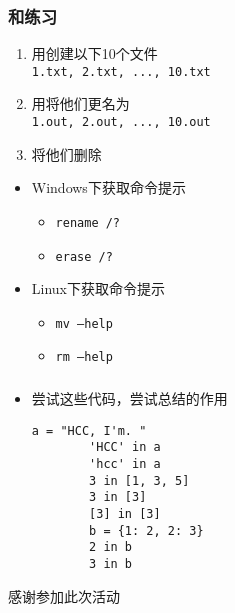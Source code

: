 \begin{frame} [fragile]
	\frametitle{和练习}
	\begin{enumerate}
	\item 用创建以下10个文件 \\
		\texttt{1.txt, 2.txt, ..., 10.txt}
	\item 用将他们更名为 \\
		\texttt{1.out, 2.out, ..., 10.out}
	\item 将他们删除
	\end{enumerate}
	\begin{itemize}
	\item Windows下获取命令提示
		\begin{itemize}
		\item \texttt{rename /?}
		\item \texttt{erase /?}
		\end{itemize}
	\item Linux下获取命令提示
		\begin{itemize}
		\item \texttt{mv --help}
		\item \texttt{rm --help}
		\end{itemize}
	\end{itemize}
\end{frame}

\begin{frame} [fragile]
	\frametitle{}
	\linespread{1.25}
	\begin{itemize}
	\item 尝试这些代码，尝试总结的作用
		\begin{lstlisting}[style=pythonstyle, gobble=8]
		a = "HCC, I'm. "
		'HCC' in a
		'hcc' in a
		3 in [1, 3, 5]
		3 in [3]
		[3] in [3]
		b = {1: 2, 2: 3}
		2 in b
		3 in b
		\end{lstlisting}
	\end{itemize}
\end{frame}

\PreLastFrame
\begin{frame}
	\centerline{\fontsize{32}{32}\selectfont 感谢参加此次活动}
\end{frame}

\newpage



